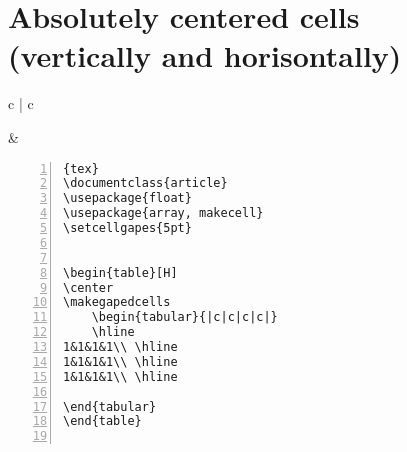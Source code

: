 \section{Absolutely centered cells (vertically and horisontally)}
\begin{tabular}{c | c}
\begin{minipage}[m]{0.4\textwidth}
\end{minipage}
&
\begin{minipage}[m]{0.55\textwidth}
\renewcommand\textminus{\mbox{-}}%
\begin{lstlisting}[numberstyle=\zebra{green!15}{yellow!15},numbers=left,basicstyle=\footnotesize]{tex}
\documentclass{article}
\usepackage{float}
\usepackage{array, makecell}
\setcellgapes{5pt}


\begin{table}[H]
\center
\makegapedcells
    \begin{tabular}{|c|c|c|c|}
    \hline
1&1&1&1\\ \hline
1&1&1&1\\ \hline
1&1&1&1\\ \hline
 
\end{tabular}
\end{table}


\end{lstlisting}
\end{minipage}
\end{tabular}

